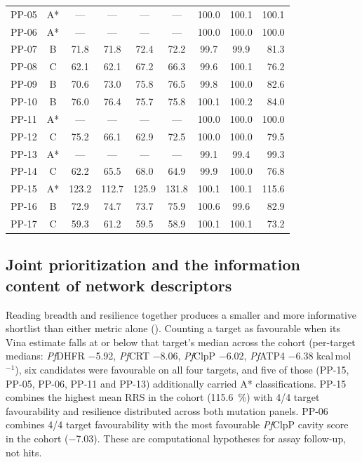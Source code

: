 \begin{table}[htbp]
{\begin{tabular}{@{}l c cccc cc r@{}}
		PP-05 & A* & --- & --- & --- & --- & \num{100.0} & \num{100.1} & \num{100.1} \\
		PP-06 & A* & --- & --- & --- & --- & \num{100.0} & \num{100.0} & \num{100.0} \\
		PP-07 & B & \num{71.8} & \num{71.8} & \num{72.4} & \num{72.2} & \num{99.7} & \num{99.9} & \num{81.3} \\
		PP-08 & C & \num{62.1} & \num{62.1} & \num{67.2} & \num{66.3} & \num{99.6} & \num{100.1} & \num{76.2} \\
		PP-09 & B & \num{70.6} & \num{73.0} & \num{75.8} & \num{76.5} & \num{99.8} & \num{100.0} & \num{82.6} \\
		PP-10 & B & \num{76.0} & \num{76.4} & \num{75.7} & \num{75.8} & \num{100.1} & \num{100.2} & \num{84.0} \\
		PP-11 & A* & --- & --- & --- & --- & \num{100.0} & \num{100.0} & \num{100.0} \\
		PP-12 & C & \num{75.2} & \num{66.1} & \num{62.9} & \num{72.5} & \num{100.0} & \num{100.0} & \num{79.5} \\
		PP-13 & A* & --- & --- & --- & --- & \num{99.1} & \num{99.4} & \num{99.3} \\
		PP-14 & C & \num{62.2} & \num{65.5} & \num{68.0} & \num{64.9} & \num{99.9} & \num{100.0} & \num{76.8} \\
		PP-15 & A* & \num{123.2} & \num{112.7} & \num{125.9} & \num{131.8} & \num{100.1} & \num{100.1} & \num{115.6} \\
		PP-16 & B & \num{72.9} & \num{74.7} & \num{73.7} & \num{75.9} & \num{100.6} & \num{99.6} & \num{82.9} \\
		PP-17 & C & \num{59.3} & \num{61.2} & \num{59.5} & \num{58.9} & \num{100.1} & \num{100.1} & \num{73.2} \\
		\bottomrule
	\end{tabular}%
	}
\end{table}

\subsection{Joint prioritization and the information content of network descriptors}

Reading breadth and resilience together produces a smaller and more informative shortlist than either metric alone (). Counting a target as favourable when its Vina estimate falls at or below that target's median across the cohort (per-target medians: \emph{Pf}DHFR \num{-5.92}, \emph{Pf}CRT \num{-8.06}, \emph{Pf}ClpP \num{-6.02}, \emph{Pf}ATP4 \num{-6.38} kcal\,mol$^{-1}$), six candidates were favourable on all four targets, and five of those (PP-15, PP-05, PP-06, PP-11 and PP-13) additionally carried A* classifications. PP-15 combines the highest mean RRS in the cohort (\qty{115.6}{\percent}) with \num{4}/\num{4} target favourability and resilience distributed across both mutation panels. PP-06 combines \num{4}/\num{4} target favourability with the most favourable \emph{Pf}ClpP cavity score in the cohort (\qty{-7.03}{\kcalmol}). These are computational hypotheses for assay follow-up, not hits.

